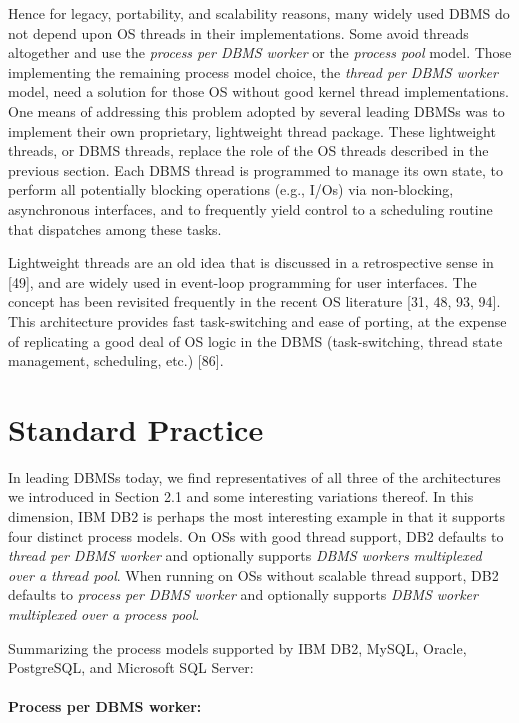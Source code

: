 \documentclass[a4paper,11pt,twoside,openright]{book}
\begin{document}
Hence for legacy, portability, and scalability reasons, many widely used
DBMS do not depend upon OS threads in their implementations. Some avoid
threads altogether and use the \emph{process per DBMS} \emph{worker} or
the \emph{process pool} model. Those implementing the remaining process
model choice, the \emph{thread per DBMS worker} model, need a solution
for those OS without good kernel thread implementations. One means of
addressing this problem adopted by several leading DBMSs
was to implement their own proprietary, lightweight thread package.
These lightweight threads, or DBMS threads, replace the role of the OS
threads described in the previous section. Each DBMS thread is
programmed to manage its own state, to perform all potentially blocking
operations (e.g., I/Os) via non-blocking, asynchronous interfaces, and
to frequently yield control to a scheduling routine that dispatches
among these tasks.

Lightweight threads are an old idea that is discussed in a retrospective
sense in {[}49{]}, and are widely used in event-loop programming for
user interfaces. The concept has been revisited frequently in the recent
OS literature {[}31, 48, 93, 94{]}. This architecture provides fast
task-switching and ease of porting, at the expense of replicating a good
deal of OS logic in the DBMS (task-switching, thread state management,
scheduling, etc.) {[}86{]}.

\hypertarget{standard-practice}{%
\section{Standard Practice}\label{standard-practice}}

In leading DBMSs today, we find representatives of all three of the
architectures we introduced in Section 2.1 and some interesting
variations thereof. In this dimension, IBM DB2 is perhaps the most
interesting example in that it supports four distinct process models. On
OSs with good thread support, DB2 defaults to \emph{thread per DBMS
worker} and optionally supports \emph{DBMS workers multiplexed over a
thread pool}. When running on OSs without scalable thread support, DB2
defaults to \emph{process per DBMS worker} and optionally supports
\emph{DBMS worker} \emph{multiplexed over a process pool}.

Summarizing the process models supported by IBM DB2, MySQL, Oracle,
PostgreSQL, and Microsoft SQL Server:

\paragraph{Process per DBMS worker:}
\end{document}
